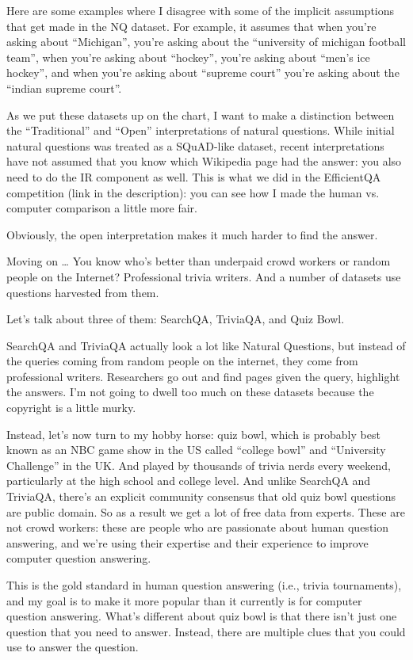 Here are some examples where I disagree with some of the implicit
assumptions that get made in the NQ dataset.  For example, it assumes
that when you’re asking about “Michigan”, you’re asking about the
“university of michigan football team”, when you’re asking about
“hockey”, you’re asking about “men’s ice hockey”, and when you’re
asking about “supreme court” you’re asking about the “indian supreme
court”.

As we put these datasets up on the chart, I want to make a distinction
between the “Traditional” and “Open” interpretations of natural
questions.  While initial natural questions was treated as a
SQuAD-like dataset, recent interpretations have not assumed that you
know which Wikipedia page had the answer: you also need to do the IR
component as well.  This is what we did in the EfficientQA competition
(link in the description): you can see how I made the human
vs. computer comparison a little more fair.

Obviously, the open interpretation makes it much harder to find the
answer.

Moving on … You know who’s better than underpaid crowd workers or
random people on the Internet?  Professional trivia writers.  And a
number of datasets use questions harvested from them.

Let’s talk about three of them: SearchQA, TriviaQA, and Quiz Bowl.

SearchQA and TriviaQA actually look a lot like Natural Questions, but
instead of the queries coming from random people on the internet, they
come from professional writers.  Researchers go out and find pages
given the query, highlight the answers.  I’m not going to dwell too
much on these datasets because the copyright is a little murky.

Instead, let's now turn to my hobby horse: quiz bowl, which is
probably best known as an NBC game show in the US called “college
bowl” and “University Challenge” in the UK.  And played by thousands
of trivia nerds every weekend, particularly at the high school and
college level.  And unlike SearchQA and TriviaQA, there’s an explicit
community consensus that old quiz bowl questions are public domain.
So as a result we get a lot of free data from experts. These are not
crowd workers: these are people who are passionate about human
question answering, and we're using their expertise and their
experience to improve computer question answering.

This is the gold standard in human question answering (i.e., trivia
tournaments), and my goal is to make it more popular than it currently
is for computer question answering.  What’s different about quiz bowl
is that there isn’t just one question that you need to answer.
Instead, there are multiple clues that you could use to answer the
question.

